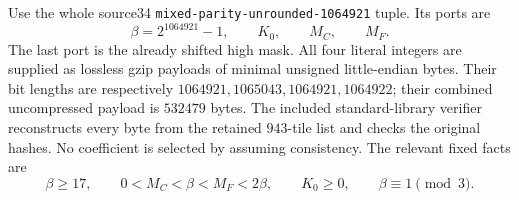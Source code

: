 Use the whole source34 \texttt{mixed-parity-unrounded-1064921} tuple.
Its ports are
\[
 \beta=2^{1064921}-1,\qquad K_0,\qquad M_C,\qquad M_F.
\]
The last port is the already shifted high mask.  All four literal integers
are supplied as lossless gzip payloads of minimal unsigned little-endian
bytes.  Their bit lengths are respectively
$1064921,1065043,1064921,1064922$; their combined uncompressed payload
is $532479$ bytes.  The included standard-library verifier reconstructs
every byte from the retained $943$-tile list and checks the original hashes.
No coefficient is selected by assuming consistency.  The relevant fixed
facts are
\begin{equation}\label{int:fixed-bounds}
 \beta\geq17,\qquad 0<M_C<\beta<M_F<2\beta,
 \qquad K_0\geq0,\qquad \beta\equiv1\pmod3.
\end{equation}

